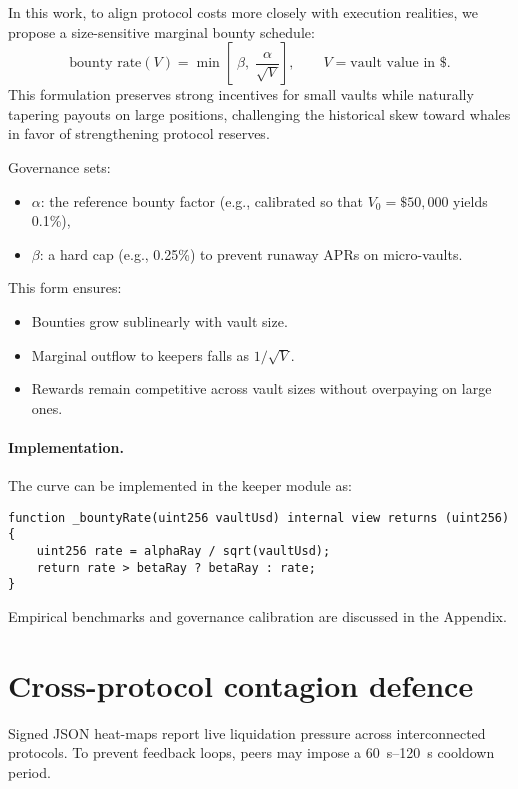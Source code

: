 \documentclass[11pt]{article}
\begin{document}
In this work, to align protocol costs more closely with execution realities, we propose a size-sensitive marginal bounty schedule:
\[
\text{bounty rate}(V)=\min\!\left[\;\beta,\;\frac{\alpha}{\sqrt{V}}\right],
\qquad V=\text{vault value in \$}.
\]
This formulation preserves strong incentives for small vaults while naturally tapering payouts on large positions, challenging the historical skew toward whales in favor of strengthening protocol reserves.

Governance sets:
\begin{itemize}[noitemsep,topsep=0pt]
  \item \( \alpha \): the reference bounty factor (e.g., calibrated so that \( V_0 = \$50,000 \) yields 0.1\%),
  \item \( \beta \): a hard cap (e.g., 0.25\%) to prevent runaway APRs on micro-vaults.
\end{itemize}

This form ensures:
\begin{itemize}[noitemsep,topsep=0pt]
  \item Bounties grow sublinearly with vault size.
  \item Marginal outflow to keepers falls as \( 1/\sqrt{V} \).
  \item Rewards remain competitive across vault sizes without overpaying on large ones.
\end{itemize}

\paragraph{Implementation.} The curve can be implemented in the keeper module as:

\begin{lstlisting}[caption={Reward curve for vault liquidations}]
function _bountyRate(uint256 vaultUsd) internal view returns (uint256) {
    uint256 rate = alphaRay / sqrt(vaultUsd);
    return rate > betaRay ? betaRay : rate;
}
\end{lstlisting}

Empirical benchmarks and governance calibration are discussed in the Appendix.


\section{Cross-protocol contagion defence}
\label{sec:contagion}
Signed JSON heat-maps report live liquidation pressure across interconnected protocols.  To prevent feedback loops, peers may impose a \SIrange{60}{120}{\second} cooldown period.  
\end{document}
